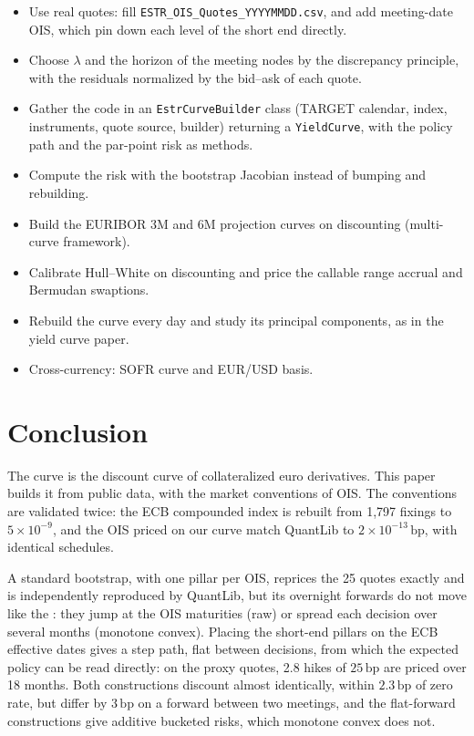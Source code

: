 \documentclass[11pt,a4paper]{article}
\theoremstyle{plain}
\theoremstyle{definition}
\newcommand{\bp}{\,\mathrm{bp}}
\newcommand{\estr}{\text{\texteuro STR}}
\begin{document}
\begin{itemize}
    \item Use real quotes: fill \texttt{ESTR\_OIS\_Quotes\_YYYYMMDD.csv}, and add meeting-date OIS, which pin down each level of the short end directly.
    \item Choose $\lambda$ and the horizon of the meeting nodes by the discrepancy principle, with the residuals normalized by the bid--ask of each quote.
    \item Gather the code in an \texttt{EstrCurveBuilder} class (TARGET calendar, \estr{} index, instruments, quote source, builder) returning a \texttt{YieldCurve}, with the policy path and the par-point risk as methods.
    \item Compute the risk with the bootstrap Jacobian instead of bumping and rebuilding.
    \item Build the EURIBOR 3M and 6M projection curves on \estr{} discounting (multi-curve framework).
    \item Calibrate Hull--White on \estr{} discounting and price the callable range accrual and Bermudan swaptions.
    \item Rebuild the curve every day and study its principal components, as in the yield curve paper.
    \item Cross-currency: SOFR curve and EUR/USD basis.
\end{itemize}

\section{Conclusion}
\label{sec:conclusion}

The \estr{} curve is the discount curve of collateralized euro derivatives. This paper builds it from public data, with the market conventions of \estr{} OIS. The conventions are validated twice: the ECB compounded index is rebuilt from 1,797 fixings to $5\times10^{-9}$, and the OIS priced on our curve match QuantLib to $2\times10^{-13}\bp$, with identical schedules.

A standard bootstrap, with one pillar per OIS, reprices the 25 quotes exactly and is independently reproduced by QuantLib, but its overnight forwards do not move like the \estr{}: they jump at the OIS maturities (raw) or spread each decision over several months (monotone convex). Placing the short-end pillars on the ECB effective dates gives a step path, flat between decisions, from which the expected policy can be read directly: on the proxy quotes, 2.8 hikes of $25\bp$ are priced over 18 months. Both constructions discount almost identically, within $2.3\bp$ of zero rate, but differ by $3\bp$ on a forward between two meetings, and the flat-forward constructions give additive bucketed risks, which monotone convex does not.
\end{document}

